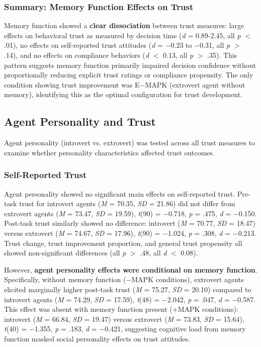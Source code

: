 \documentclass[12pt]{article}
\begin{document}
\subsubsection{Summary: Memory Function Effects on Trust}

Memory function showed a \textbf{clear dissociation} between trust measures: large effects on behavioral trust as measured by decision time (\textit{d} = 0.89-2.45, all \textit{p} $<$ .01), no effects on self-reported trust attitudes (\textit{d} = $-$0.23 to $-$0.31, all \textit{p} $>$ .14), and no effects on compliance behaviors (\textit{d} $<$ 0.13, all \textit{p} $>$ .35). This pattern suggests memory function primarily impaired decision confidence without proportionally reducing explicit trust ratings or compliance propensity. The only condition showing trust improvement was E$-$MAPK (extrovert agent without memory), identifying this as the optimal configuration for trust development.

\subsection{Agent Personality and Trust}

Agent personality (introvert vs. extrovert) was tested across all trust measures to examine whether personality characteristics affected trust outcomes.

\subsubsection{Self-Reported Trust}

Agent personality showed no significant main effects on self-reported trust. Pre-task trust for introvert agents (\textit{M} = 70.35, \textit{SD} = 21.86) did not differ from extrovert agents (\textit{M} = 73.47, \textit{SD} = 19.59), \textit{t}(90) = $-$0.718, \textit{p} = .475, \textit{d} = $-$0.150. Post-task trust similarly showed no difference: introvert (\textit{M} = 70.77, \textit{SD} = 18.47) versus extrovert (\textit{M} = 74.67, \textit{SD} = 17.96), \textit{t}(90) = $-$1.024, \textit{p} = .308, \textit{d} = $-$0.213. Trust change, trust improvement proportion, and general trust propensity all showed non-significant differences (all \textit{p} $>$ .48, all \textit{d} $<$ 0.08).

However, \textbf{agent personality effects were conditional on memory function}. Specifically, without memory function ($-$MAPK conditions), extrovert agents elicited marginally higher post-task trust (\textit{M} = 75.27, \textit{SD} = 20.10) compared to introvert agents (\textit{M} = 74.29, \textit{SD} = 17.59), \textit{t}(48) = $-$2.042, \textit{p} = .047, \textit{d} = $-$0.587. This effect was absent with memory function present (+MAPK conditions): introvert (\textit{M} = 66.84, \textit{SD} = 19.47) versus extrovert (\textit{M} = 73.83, \textit{SD} = 15.64), \textit{t}(40) = $-$1.355, \textit{p} = .183, \textit{d} = $-$0.421, suggesting cognitive load from memory function masked social personality effects on trust attitudes.
\end{document}
